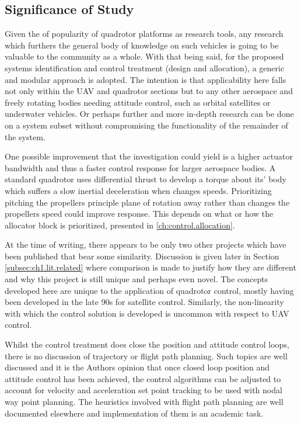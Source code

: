 \subsection{Significance of Study}
\label{subsec:intro.foreward.significance}
Given the of popularity of quadrotor platforms as research tools, any research which furthers the general body of knowledge on such vehicles is going to be valuable to the community as a whole. With that being said, for the proposed systems identification and control treatment (design and allocation), a generic and modular approach is adopted. The intention is that applicability here falls not only within the UAV and quadrotor sections but to any other aerospace and freely rotating bodies needing attitude control, such as orbital satellites or underwater vehicles. Or perhaps further and more in-depth research can be done on a system subset without compromising the functionality of the remainder of the system. 
\par
One possible improvement that the investigation could yield is a higher actuator bandwidth and thus a faster control response for larger aerospace bodies. A standard quadrotor uses differential thrust to develop a torque about its' body which suffers a slow inertial deceleration when changes speeds. Prioritizing pitching the propellers principle plane of rotation away rather than changes the propellers speed could improve response. This depends on what or how the allocator block is prioritized, presented in \ref{ch:control.allocation}.
\par
At the time of writing, there appears to be only two other projects which have been published that bear some similarity. Discussion is given later in Section \ref{subsec:ch1.lit.related} where comparison is made to justify how they are different and why this project is still unique and perhaps even novel. The concepts developed here are unique to the application of quadrotor control, mostly having been developed in the late 90s for satellite control. Similarly, the non-linearity with which the control solution is developed is uncommon with respect to UAV control.
\par
Whilst the control treatment does close the position  and attitude control loops, there is no discussion of trajectory or flight path planning. Such topics are well discussed and it is the Authors opinion that once closed loop position and attitude control has been achieved, the control algorithms can be adjusted to account for velocity and acceleration set point tracking to be used with nodal way point planning. The heuristics involved with flight path planning are well documented elsewhere and implementation of them is an academic task.
